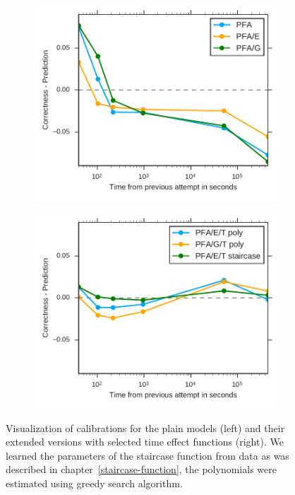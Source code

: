 \begin{figure}[htbp]
  \centering
  \begin{subfigure}{.49\textwidth}
    \centering
    \includegraphics[width=\textwidth]{img/calibration-time-effect-off}
    \caption{}
    \label{fig:calibration-time-effect-off}
  \end{subfigure}
  \begin{subfigure}{.49\textwidth}
    \centering
    \includegraphics[width=\textwidth]{img/calibration-time-effect-on}
    \caption{}
    \label{fig:calibration-time-effect-on}
  \end{subfigure}
  \label{fig:calibration1}
  \caption{Visualization of calibrations for the plain models (left) and their extended versions with selected time effect functions (right). We learned the parameters of the staircase function from data as was described in chapter~\ref{staircase-function}, the polynomials were estimated using greedy search algorithm.}
\end{figure}

